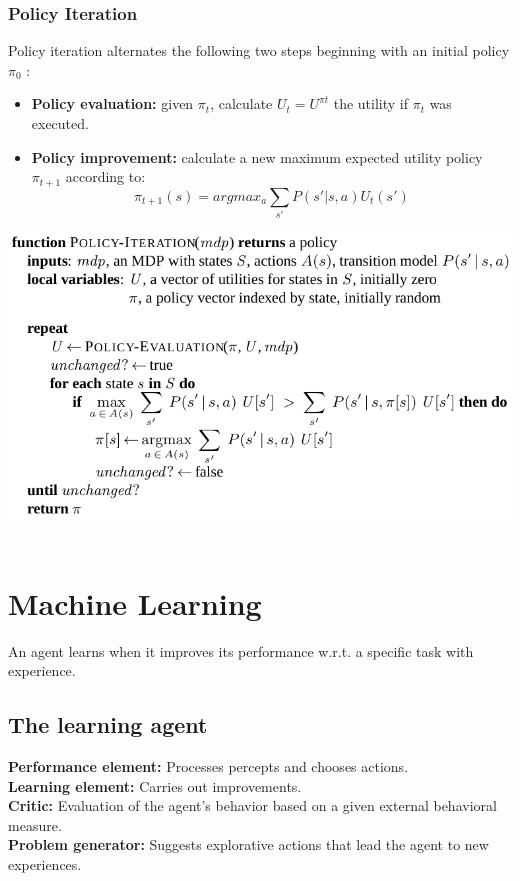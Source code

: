 \documentclass{article}
\begin{document}
\subsubsection{Policy Iteration}
Policy iteration alternates the following two steps beginning with an initial policy $\pi_0$ :
\begin{itemize}
\item \textbf{Policy evaluation: } given $\pi_t$, calculate $U_t=U^{\pi t}$ the utility if $\pi_t$ was executed.
\item \textbf{Policy improvement: }calculate a new maximum expected utility policy $\pi_{t+1}$ according to:
\begin{equation}
\pi_{t+1}(s)=argmax_a\sum_{s'}P(s'|s,a)U_t(s')
\end{equation}
\end{itemize}
\includegraphics[scale=0.5]{83.png}\\\\

\section{Machine Learning}
An agent learns when it improves its performance w.r.t. a specific task with experience.\\
\subsection{The learning agent}
\textbf{Performance element: }Processes percepts and chooses actions.\\
\textbf{Learning element: }Carries out improvements.\\
\textbf{Critic: }Evaluation of the agent’s behavior based on a given external behavioral measure.\\
\textbf{Problem generator: }Suggests explorative actions that lead the agent to new experiences.\\\\
\end{document}
